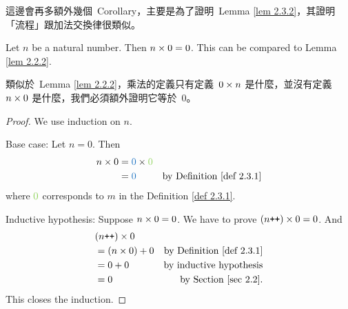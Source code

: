 \begin{note}
這邊會再多額外幾個\ Corollary，主要是為了證明\ Lemma \ref{lem 2.3.2}，其證明「流程」跟加法交換律很類似。
\end{note}

\begin{additional corollary} \label{ac 2.3.2}
Let \(n\) be a natural number. Then \(n \times 0 = 0\). This can be compared to Lemma \ref{lem 2.2.2}.
\end{additional corollary}
\begin{note}
類似於\ Lemma \ref{lem 2.2.2}，乘法的定義只有定義\ \(0 \times n\) 是什麼，並沒有定義\ \(n \times 0\) 是什麼，我們必須額外證明它等於\ 0。
\end{note}
\begin{proof}
We use induction on \(n\).

Base case: Let \(n = 0\). Then
\begin{align*}
    n \X 0 & = \BLUE{0} \X \GREEN{0} \\
           & = \BLUE{0} & \text{by Definition \ref{def 2.3.1}}
\end{align*}
where \(\GREEN{0}\) corresponds to \(m\) in the Definition \ref{def 2.3.1}.

Inductive hypothesis: Suppose \(n \times 0 = 0\). We have to prove \((n\texttt{++}) \times 0 = 0\). And
\begin{align*}
     & (n\texttt{++}) \times 0 \\
     & = (n \times 0) + 0 & \text{by Definition \ref{def 2.3.1}} \\
     & = 0 + 0 &  \text{by inductive hypothesis} \\
     & = 0 &  \text{by Section \ref{sec 2.2}.}
\end{align*}
This closes the induction.
\end{proof}

